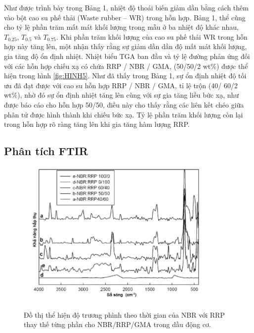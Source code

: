\documentclass[12pt,a4paper]{article}
\begin{document}
	Như được trình bày trong Bảng 1, nhiệt độ thoái biến giảm dần bằng cách thêm vào bột cao su phế thải (Waste rubber – WR) trong hỗn hợp. Bảng 1, thể cũng cho tỷ lệ phần trăm mất mát khối lượng trong mẫu ở ba nhiệt độ khác nhau, $T_{0.25}$, $T_{0.5}$ và $T_{0.75}$. Khi phần trăm khối lượng của cao su phế thải WR trong hỗn hợp này tăng lên, một nhận thấy rằng sự giảm dần dần độ mất mát khối lượng, gia tăng độ ổn định nhiệt. Nhiệt biểu TGA ban đầu và tỷ lệ đường phản ứng đối với các hỗn hợp chiếu xạ có chứa RRP / NBR / GMA, (50/50/2 wt\%) được thể hiện trong hình \ref{fig:HINH5}. Như đã thấy trong Bảng 1, sự ổn định nhiệt độ tối ưu đã đạt được với cao su hỗn hợp RRP / NBR / GMA, tỉ lệ trộn (40/ 60/2 wt\%), nhờ đó sự ổn định nhiệt tăng lên cùng với sự gia tăng liều bức xạ, như được báo cáo cho hỗn hợp 50/50, điều này cho thấy rằng các liên kết chéo giữa phân tử được hình thành khi chiếu bức xạ. Tỷ lệ phần trăm khối lượng còn lại trong hỗn hợp rõ ràng tăng lên khi gia tăng hàm lượng RRP.\\
	
	\subsection{Phân tích FTIR}
	
		\begin{figure}
			\centering
			\includegraphics[width=0.9\textwidth]{8.JPG}
			\label{fig:HINH_6}
			\caption{Đồ thị thể hiện độ trương phình theo thời gian của NBR với RRP thay thế từng phần cho NBR/RRP/GMA trong dầu động cơ.}
		\end{figure}
			
\end{document}
